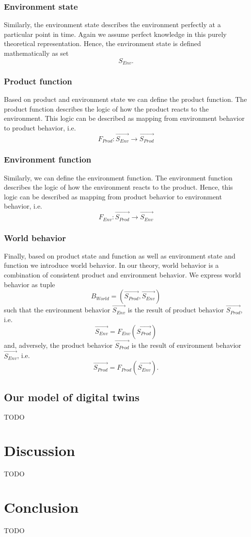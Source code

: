 \documentclass[conference]{IEEEtran}
\begin{document}
    \subsubsection{Environment state}
    Similarly, the environment state describes the environment perfectly at a particular point in time.
    Again we assume perfect knowledge in this purely theoretical representation.
    Hence, the environment state is defined mathematically as set
    \[
        S_{Env}.
    \]
    
    \subsubsection{Product function}
    Based on product and environment state we can define the product function.
    The product function describes the logic of how the product reacts to the environment.
    This logic can be described as mapping from environment behavior to product behavior, i.e.
    \[
        F_{Prod}: \overrightarrow{S_{Env}} \rightarrow \overrightarrow{S_{Prod}}
    \]

    \subsubsection{Environment function}
    Similarly, we can define the environment function.
    The environment function describes the logic of how the environment reacts to the product.
    Hence, this logic can be described as mapping from product behavior to environment behavior, i.e.
    \[
        F_{Env}: \overrightarrow{S_{Prod}} \rightarrow \overrightarrow{S_{Env}}
    \]

    \subsubsection{World behavior}
    Finally, based on product state and function as well as environment state and function we introduce world behavior.
    In our theory, world behavior is a combination of consistent product and environment behavior.
    We express world behavior as tuple
    \[
        B_{World} = (\overrightarrow{S_{Prod}}, \overrightarrow{S_{Env}})
    \]
    such that the environment behavior $\overrightarrow{S_{Env}}$ is the result of product behavior $\overrightarrow{S_{Prod}}$, i.e.
    \[
        \overrightarrow{S_{Env}} = F_{Env}(\overrightarrow{S_{Prod}})
    \]
    and, adversely, the product behavior $\overrightarrow{S_{Prod}}$ is the result of environment behavior $\overrightarrow{S_{Env}}$, i.e.
    \[
        \overrightarrow{S_{Prod}} = F_{Prod}(\overrightarrow{S_{Env}}).
    \]

    \subsection{Our model of digital twins}
    \label{section:theory-twin}
    TODO

    \section{Discussion}
    \label{section:discussion}
    TODO

    \section{Conclusion}
    \label{section:conclusion}
    TODO
    
    
    
    
\end{document}
